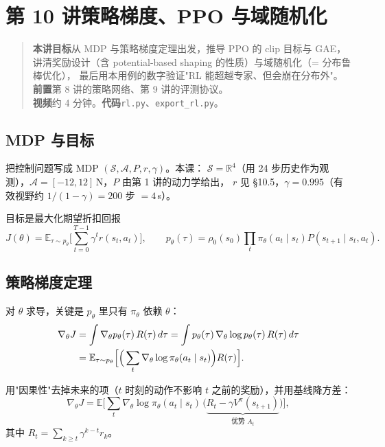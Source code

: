\chapter[强化学习微调]{第 10 讲\quad 策略梯度、PPO 与域随机化}
\label{ch:rl}

\begin{quote}\small
\textbf{本讲目标}\quad 从 MDP 与策略梯度定理出发，推导 PPO 的 clip 目标与 GAE，
讲清奖励设计（含 potential-based shaping 的性质）与域随机化（= 分布鲁棒优化），
最后用本用例的数字验证"RL 能超越专家、但会崩在分布外"。\\[2pt]
\textbf{前置}\quad 第 8 讲的策略网络、第 9 讲的评测协议。\\
\textbf{视频}\quad 约 4 分钟。\quad\textbf{代码}\quad \texttt{rl.py}、\texttt{export\_rl.py}。
\end{quote}

\section{MDP 与目标}

把控制问题写成 MDP $(\mathcal{S},\mathcal{A},P,r,\gamma)$。本课：
$\mathcal{S}=\mathbb{R}^4$（用 24 步历史作为观测），$\mathcal{A}=[-12,12]$\,N，$P$ 由第 1 讲的动力学给出，
$r$ 见 \S10.5，$\gamma=0.995$（有效视野约 $1/(1-\gamma)=200$ 步 $=4$\,s）。

目标是最大化期望折扣回报
\begin{equation}
  J(\theta)=\mathbb{E}_{\tau\sim p_\theta}\Big[\sum_{t=0}^{T-1}\gamma^t r(s_t,a_t)\Big],
  \qquad p_\theta(\tau)=\rho_0(s_0)\prod_t \pi_\theta(a_t\mid s_t)P(s_{t+1}\mid s_t,a_t).
\end{equation}

\section{策略梯度定理}

对 $\theta$ 求导，关键是 $p_\theta$ 里只有 $\pi_\theta$ 依赖 $\theta$：
\begin{align}
  \nabla_\theta J
  &=\int \nabla_\theta p_\theta(\tau)\,R(\tau)\,d\tau
   =\int p_\theta(\tau)\,\nabla_\theta\log p_\theta(\tau)\,R(\tau)\,d\tau \notag\\
  &=\mathbb{E}_{\tau\sim p_\theta}\Big[\Big(\sum_t\nabla_\theta\log\pi_\theta(a_t\mid s_t)\Big)R(\tau)\Big].
  \label{eq:pg}
\end{align}

用"因果性"去掉未来的项（$t$ 时刻的动作不影响 $t$ 之前的奖励），并用基线降方差：
\begin{equation}
  \nabla_\theta J=\mathbb{E}\Big[\sum_t \nabla_\theta\log\pi_\theta(a_t\mid s_t)\,
  \big(\underbrace{R_t-\gamma V^\pi(s_{t+1})}_{\text{优势 }A_t}\big)\Big],
  \label{eq:pg2}
\end{equation}
其中 $R_t=\sum_{k\ge t}\gamma^{k-t}r_k$。


